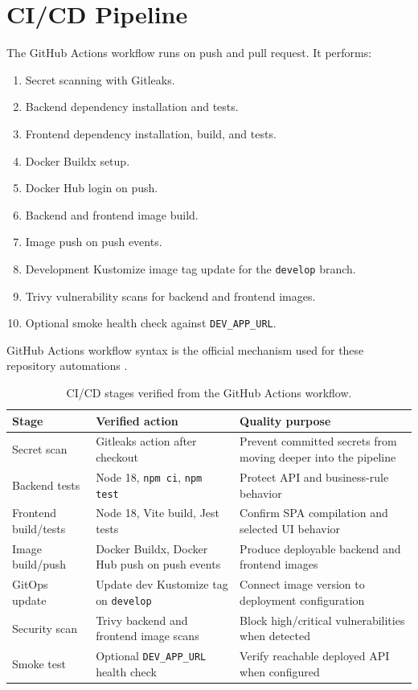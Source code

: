 


\section{CI/CD Pipeline}
The GitHub Actions workflow runs on push and pull request. It performs:
\begin{enumerate}
\item Secret scanning with Gitleaks.
\item Backend dependency installation and tests.
\item Frontend dependency installation, build, and tests.
\item Docker Buildx setup.
\item Docker Hub login on push.
\item Backend and frontend image build.
\item Image push on push events.
\item Development Kustomize image tag update for the \texttt{develop} branch.
\item Trivy vulnerability scans for backend and frontend images.
\item Optional smoke health check against \texttt{DEV\_APP\_URL}.
\end{enumerate}
GitHub Actions workflow syntax is the official mechanism used for these repository automations \cite{githubActionsDocs}.

\begin{table}[H]\centering\small
\caption{CI/CD stages verified from the GitHub Actions workflow.}
\label{tab:cicd-stages}
\begin{tabularx}{\textwidth}{p{}p{}Y}
\toprule
Stage & Verified action & Quality purpose\\
\midrule
Secret scan & Gitleaks action after checkout & Prevent committed secrets from moving deeper into the pipeline\\
Backend tests & Node 18, \texttt{npm ci}, \texttt{npm test} & Protect API and business-rule behavior\\
Frontend build/tests & Node 18, Vite build, Jest tests & Confirm SPA compilation and selected UI behavior\\
Image build/push & Docker Buildx, Docker Hub push on push events & Produce deployable backend and frontend images\\
GitOps update & Update dev Kustomize tag on \texttt{develop} & Connect image version to deployment configuration\\
Security scan & Trivy backend and frontend image scans & Block high/critical vulnerabilities when detected\\
Smoke test & Optional \texttt{DEV\_APP\_URL} health check & Verify reachable deployed API when configured\\
\bottomrule
\end{tabularx}
\end{table}

